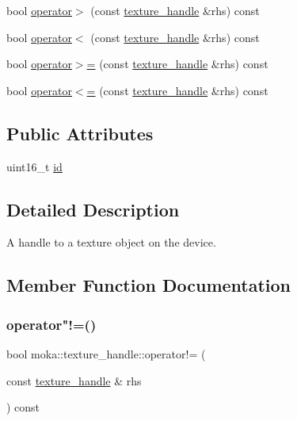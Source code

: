 \begin{DoxyCompactItemize}
\item 
bool \mbox{\hyperlink{structmoka_1_1texture__handle_abddd549d0ed65bb69d4542a5d4f7569a}{operator$>$}} (const \mbox{\hyperlink{structmoka_1_1texture__handle}{texture\+\_\+handle}} \&rhs) const
\item 
bool \mbox{\hyperlink{structmoka_1_1texture__handle_a95f0ca42db2cbb2f41f0b8ec2ec44863}{operator$<$}} (const \mbox{\hyperlink{structmoka_1_1texture__handle}{texture\+\_\+handle}} \&rhs) const
\item 
bool \mbox{\hyperlink{structmoka_1_1texture__handle_a21e800c656613a89c69f96c522bd3e9c}{operator$>$=}} (const \mbox{\hyperlink{structmoka_1_1texture__handle}{texture\+\_\+handle}} \&rhs) const
\item 
bool \mbox{\hyperlink{structmoka_1_1texture__handle_ac5ddcdc527e92d6ac4affd53d0628d89}{operator$<$=}} (const \mbox{\hyperlink{structmoka_1_1texture__handle}{texture\+\_\+handle}} \&rhs) const
\end{DoxyCompactItemize}
\subsection*{Public Attributes}
\begin{DoxyCompactItemize}
\item 
uint16\+\_\+t \mbox{\hyperlink{structmoka_1_1texture__handle_a2f5aa97e077908c84ecbd822024011c7}{id}}
\end{DoxyCompactItemize}


\subsection{Detailed Description}
A handle to a texture object on the device. 

\subsection{Member Function Documentation}
\mbox{\label{structmoka_1_1texture__handle_aac5e6455e729c16683add7bff4931165}} 
\subsubsection{\texorpdfstring{operator"!=()}{operator!=()}\hspace{0.1cm}{\footnotesize\ttfamily [1/2]}}
{\footnotesize\ttfamily bool moka\+::texture\+\_\+handle\+::operator!= (\begin{DoxyParamCaption}\item[{const \mbox{\hyperlink{structmoka_1_1texture__handle}{texture\+\_\+handle}} \&}]{rhs }\end{DoxyParamCaption}) const}

